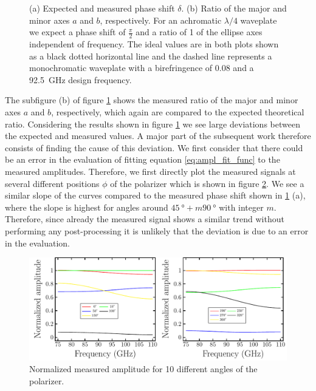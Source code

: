 \begin{figure}[H]
\begin{subfigure}[b]{.5\linewidth}
    \end{subfigure}
    \caption{(a) Expected and measured phase shift $\delta$. (b) Ratio of the major and minor axes $a$ and $b$, respectively. For an achromatic $\lambda/4$ waveplate we expect a phase shift of $\frac{\pi}{2}$ and a ratio of 1 of the ellipse axes independent of frequency. The ideal values are in both plots shown as a black dotted horizontal line and the dashed line represents a monochromatic waveplate with a birefringence of $0.08$ and a \SI{92.5}{\giga \hertz} design frequency.}
    \label{fig:meas_result}
\end{figure}

The subfigure (b) of figure \ref{fig:meas_result} shows the measured ratio of the major and minor axes $a$ and $b$, respectively, which again are compared to the expected theoretical ratio. Considering the results shown in figure \ref{fig:meas_result} we see large deviations between the expected and measured values. A major part of the subsequent work therefore consists of finding the cause of this deviation. We first consider that there could be an error in the evaluation of fitting equation \ref{eq:ampl_fit_func} to the measured amplitudes. Therefore, we first directly plot the measured signals at several different positions $\phi$ of the polarizer which is shown in figure \ref{fig:measured_amplitude}. We see a similar slope of the curves compared to the measured phase shift shown in \ref{fig:meas_result} (a), where the slope is highest for angles around $\SI{45}{\degree}+m\SI{90}{\degree}$ with integer $m$. Therefore, since already the measured signal shows a similar trend without performing any post-processing it is unlikely that the deviation is due to an error in the evaluation.

\begin{figure}[H]
    \centering
    \includegraphics[scale=0.63]{images/results/plots/polymer/measured_amplitude.pdf}
    \caption{Normalized measured amplitude for 10 different angles of the polarizer.}
    \label{fig:measured_amplitude}
\end{figure}

